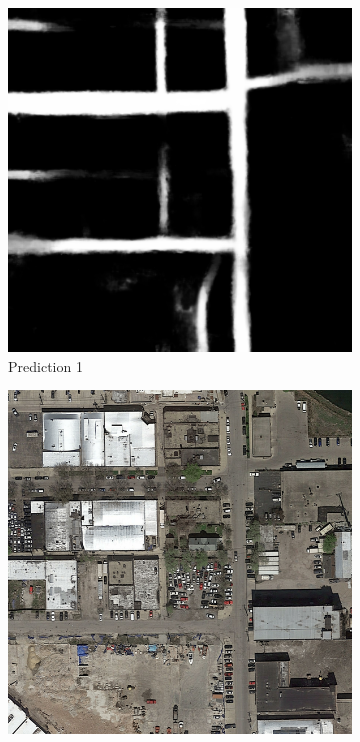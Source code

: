 \documentclass[10pt,conference,a4paper]{IEEEtran}
\begin{document}
\begin{figure}[ht]
  \begin{subfigure}[b]{0.2\textwidth}
    \includegraphics[width=\textwidth]{project2/report/images/gt_12.png}
    \caption{Prediction 1}
    \label{fig:gt1}
  \end{subfigure}
  \begin{subfigure}[b]{0.2\textwidth}
    \includegraphics[width=\textwidth]{project2/report/images/test_12.png}

\end{subfigure}
\end{figure}
\end{document}
